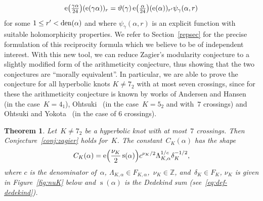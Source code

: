 \documentclass[11pt]{amsart}
\newcommand{\Z}{\mathbb{Z}}
\newcommand{\tn}[1]{\textnormal{#1}}
\newtheorem{theo}{Theorem}
\theoremstyle{definition}
\newcommand{\pr}[1]{\mathchoice{\left( #1\right)}{(#1)}{(#1)}{(#1)}}
\newcommand{\e}[1][]{\ifthenelse{\equal{#1}{}}{{\rm e}}{\operatorname{e}\pr{ #1}}}
\DeclareMathOperator{\deks}{s}
\newcommand{\1}{{\mathbf 1}}
\let\originalleft\left
\let\originalright\right
\renewcommand{\left}{\mathopen{}\mathclose\bgroup\originalleft}
\renewcommand{\right}{\aftergroup\egroup\originalright}
\numberwithin{equation}{section}
\begin{document}
\begin{equation}\label{eq:mro}
\e[\tfrac {\gamma \alpha}{24}](\e[\gamma \alpha])_r= \vartheta(\gamma) \e[\tfrac{\alpha}{24}](\e[ \alpha])_{r'}\psi_\gamma(\alpha,r)
\end{equation}
for some $1\leq r'< \tn{den}( \alpha)$ and where $\psi_\gamma(\alpha,r)$ is an explicit function with suitable holomorphicity properties. We refer to Section~\ref{repsec} for the precise formulation of this reciprocity formula which we believe to be of independent interest.
 With this new tool, we can reduce Zagier's modularity conjecture to a slightly modified form of the arithmeticity conjecture, thus showing that the two conjectures are ``morally equivalent''.
In particular, we are able to prove the conjecture for all hyperbolic knots $K\neq 7_2$ with at most seven crossings, since for these the arithmeticity conjecture is known by works of Andersen and Hansen~\cite{AndersenHansen2006} (in the case~$K=4_1$), Ohtsuki~\cite{Ohtsuki52,Ohtsuki7} (in the case~$K=5_2$ and with~$7$ crossings) and Ohtsuki and Yokota~\cite{OhtsukiYokota6} (in the case of $6$ crossings).


\begin{theo}\label{th:1}
  Let~$K\neq 7_2$ be a hyperbolic knot with at most~$7$ crossings. Then Conjecture~\ref{conj:zagier} holds for~$K$. The constant~$C_K(\alpha)$ has the shape
  \begin{equation}
    C_K(\alpha) = \e\Big(\frac{\nu_K}2 \deks(\alpha)\Big) c^{\nu_K/2} \Lambda_{K, \alpha}^{1/c} \delta_K^{-1/2},\label{eq:expr-CK}
  \end{equation}
  where $c$ is the denominator of~$\alpha$, $\Lambda_{K, \alpha} \in F_{K,\alpha}$,~$\nu_K\in\Z$, and~$\delta_K \in F_K$, $\nu_K$ is given in Figure~\ref{fig:nuK} below and $\deks(\alpha)$ is the Dedekind sum (see~\eqref{eq:def-dedekind}).
\end{theo}
\end{document}

